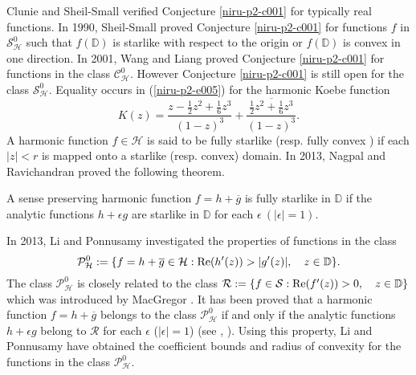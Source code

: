 \documentclass[a4paper,12pt]{amsart}
\theoremstyle{plain}
\newenvironment{customthm}[1]
  {\innercustomthm}
  {\endinnercustomthm}
\theoremstyle{definition}
\begin{document}
Clunie and Sheil-Small \cite{Clunie-1984} verified Conjecture \ref{niru-p2-c001} for typically real functions. In 1990, Sheil-Small \cite{Sheil-Small-1990} proved Conjecture \ref{niru-p2-c001} for functions $f$ in $\mathcal{S}^0_{\mathcal{H}}$ such that  $f(\mathbb{D})$ is starlike with respect to the origin or  $f(\mathbb{D})$ is convex in one direction.
In 2001, Wang and Liang \cite{Wang-Liang-2001} proved Conjecture \ref{niru-p2-c001} for  functions in the class $\mathcal{C}^0_{\mathcal{H}}$. However Conjecture \ref{niru-p2-c001} is still open for the class $\mathcal{S}^0_{\mathcal{H}}$. Equality occurs in (\ref{niru-p2-e005}) for the harmonic Koebe function
\begin{equation}\label{niru-p2-e006}
K(z) = \frac{z - \frac{1}{2}z^2 + \frac{1}{6}z^3}{(1 - z)^3} + \overline{\frac{\frac{1}{2}z^2 + \frac{1}{6}z^3}{(1 - z)^3}}.
\end{equation}
A harmonic function $f\in\mathcal{H}$ is said to be fully starlike (resp. fully convex ) if each $|z|< r$ is mapped onto a starlike (resp. convex) domain.
In 2013, Nagpal and  Ravichandran \cite{Nagpal-Ravichandran-2013} proved the following theorem.
 
\begin{customthm}{A}\label{niru-p2-t001}\cite{Nagpal-Ravichandran-2013}
A sense preserving harmonic function $f = h + \overline{g}$ is fully starlike in $\mathbb{D}$ if the analytic functions $h + \epsilon g$ are starlike in $\mathbb{D}$ for each $\epsilon ~ (|\epsilon|= 1)$.

\end{customthm}

In 2013, Li and Ponnusamy \cite{Li-Ponnusamy-2013} investigated  the properties of functions in the class
$$
\mathcal{P}^0_{\mathcal{H}} := \{f = h + \overline{g}\in\mathcal{H} : {\rm Re}(h'(z))> |g'(z)|,\quad z\in \mathbb{D}\}.
$$
The class $\mathcal{P}^0_{\mathcal{H}}$ is closely related to the class $\mathcal {R} := \{f\in \mathcal{S}: {\rm Re}(f'(z))> 0, \quad z\in\mathbb{D}\}$ which was introduced by MacGregor \cite{MacGregor-1962}. It has been proved that a harmonic function $f = h + \overline{g}$ belongs to the class $\mathcal{P}^0_{\mathcal{H}}$ if and only if the analytic functions $h + \epsilon g$ belong to $\mathcal {R}$ for each $\epsilon$ ($|\epsilon| = 1$) (see \cite{Li-Ponnusamy-2013}, \cite{Ponnusamy-Li-2013}). Using this property, Li and Ponnusamy \cite{Li-Ponnusamy-2013} have obtained the coefficient bounds and radius of convexity for the functions in the class $\mathcal{P}^0_{\mathcal{H}}$.
\end{document}

